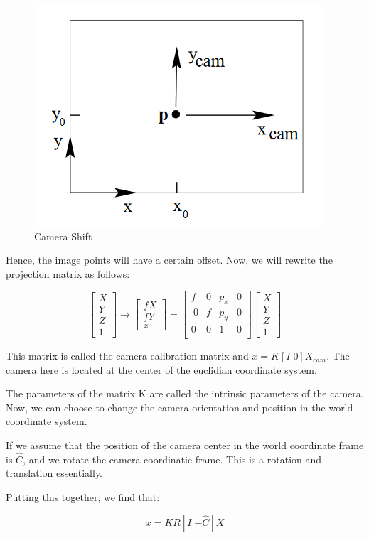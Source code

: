\begin{figure}
    \centering
    \includegraphics{img/camera-shift.png}
    \caption{Camera Shift}
    \label{fig:camera-shift}
\end{figure}

Hence, the image points will have a certain offset. Now, we will rewrite the projection matrix as follows:

\begin{equation*}
    \begin{bmatrix}
    X \\
    Y \\
    Z \\
    1
    \end{bmatrix}\longrightarrow \begin{bmatrix}
    fX \\
    fY \\
    z
    \end{bmatrix} = \begin{bmatrix}
    f & 0 & p_x & 0 \\\
    0 & f & p_y & 0 \\
    0 & 0 & 1 & 0 \\
    \end{bmatrix} \begin{bmatrix}
    X \\
    Y \\
    Z \\
    1
    \end{bmatrix}
\end{equation*}

This matrix is called the camera calibration matrix and $x = K[I|0]X_{cam}$. The camera here is located at the center of the euclidian coordinate system. 

The parameters of the matrix K are called the intrinsic parameters of the camera. Now, we can choose to change the camera orientation and position in the world coordinate system.

If we assume that the position of the camera center in the world coordinate frame is $\hat{C}$, and we rotate the camera coordinatie frame. This is a rotation and translation essentially.

Putting this together, we find that:

\begin{equation}
    x = KR[I|-\hat{C}]X
\end{equation}



